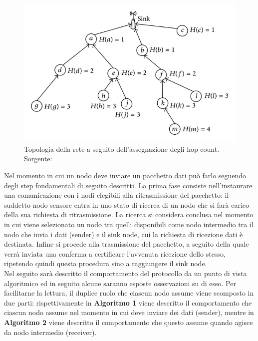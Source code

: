 \documentclass[binding=0.6cm,TFA]{sapthesis}
\begin{document}
\begin{figure}
    \begin{center}
        \includegraphics[scale=1.7]{hop-count-algorithm.png}
        \caption{Topologia della rete a seguito dell'assegnazione degli hop count. Sorgente: \cite{hop-count-figure}}
    \end{center}
\end{figure}

Nel momento in cui un nodo deve inviare un pacchetto dati può farlo seguendo degli step fondamentali di seguito descritti.
La prima fase consiste nell'instaurare una comunicazione con i nodi elegibili alla ritrasmissione del pacchetto: il suddetto nodo sensore
entra in uno stato di ricerca di un nodo che si farà carico della sua richiesta di ritrasmissione. La ricerca si considera conclusa
nel momento in cui viene selezionato un nodo tra quelli disponibili come nodo intermedio tra il nodo che invia i dati (sender) e il sink
node, cui la richiesta di ricezione dati è destinata. Infine si procede alla trasmissione del pacchetto, a seguito della quale
verrà inviata una conferma a certificare l'avvenuta ricezione dello stesso, ripetendo quindi questa procedura sino a raggiungere
il sink node.\\

Nel seguito sarà descritto il comportamento del protocollo da un punto di vista algoritmico ed in seguito alcune saranno esposte osservazioni su di esso.
Per facilitarne la lettura, il duplice ruolo che ciascun nodo assume viene scomposto in due parti: rispettivamente in \textbf{Algoritmo 1}
viene descritto il comportamento che ciascun nodo assume nel momento in cui deve inviare dei dati (sender), mentre in \textbf{Algoritmo 2}
viene descritto il comportamento che questo assume quando agisce da nodo intermedio (receiver).
\end{document}

